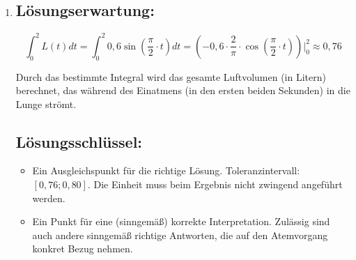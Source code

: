 \begin{langesbeispiel}
{\begin{enumerate}
		Die Periodenlänge beträgt 4 Sekunden.
		
		Die Periodenlänge gibt die Zeitdauer eines Atemzyklus (= einmal Einatmen und einmal Ausatmen) an.
	 	
	\subsection{Lösungsschlüssel:}
	\begin{itemize}
		\item Ein Punkt für die korrekte Ermittlung der Periodenlänge. Es genügt dabei die Angabe des gesuchten Wertes, eine Rechnung oder Zeichnung ist nicht erforderlich.
		\item Ein Punkt für eine (sinngemäß) korrekte Deutung der Periodenlänge. Zulässig sind auch andere sinngemäß richtige Antworten, die auf den Atemvorgang konkret Bezug nehmen. Ohne konkreten Bezug zum gegebenen Kontext ist die Antwort nicht als korrekt zu werten.
	\end{itemize}
	
	\item \subsection{Lösungserwartung:}
			
		$$\int^2_0{L(t)}dt=\int^2_0{0,6\sin\left(\frac{\pi}{2}\cdot t\right)}dt=\left(-0,6\cdot \frac{2}{\pi}\cdot \cos\left(\frac{\pi}{2}\cdot t\right)\right)\bigg|^2_0\approx 0,76$$
		
		Durch das bestimmte Integral wird das gesamte Luftvolumen (in Litern) berechnet, das während des Einatmens (in den ersten beiden Sekunden) in die Lunge strömt.
		
	\subsection{Lösungsschlüssel:}
	
\begin{itemize}
	\item  Ein Ausgleichspunkt für die richtige Lösung. Toleranzintervall: $[0,76; 0,80]$. Die Einheit muss beim Ergebnis nicht zwingend angeführt werden.
	\item Ein Punkt für eine (sinngemäß) korrekte Interpretation. Zulässig sind auch andere sinngemäß richtige Antworten, die auf den Atemvorgang konkret Bezug nehmen.
\end{itemize}

\end{enumerate}}
		\end{langesbeispiel}